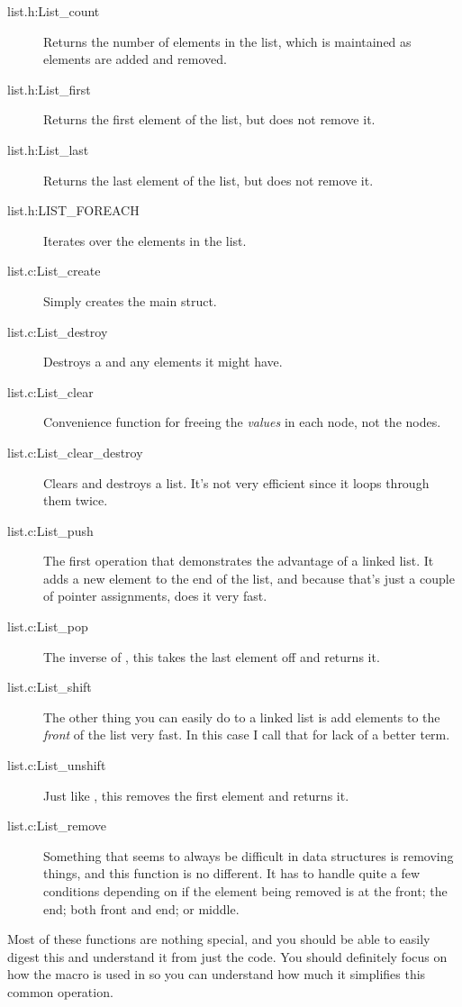 \begin{description}
\item[list.h:List\_count] Returns the number of elements in the list, which is 
    maintained as elements are added and removed.
\item[list.h:List\_first] Returns the first element of the list, but does not
    remove it.
\item[list.h:List\_last] Returns the last element of the list, but does not
    remove it.
\item[list.h:LIST\_FOREACH] Iterates over the elements in the list.
\item[list.c:List\_create] Simply creates the main  struct.
\item[list.c:List\_destroy] Destroys a  and any elements it might have.
\item[list.c:List\_clear] Convenience function for freeing the \emph{values} in each
    node, not the nodes.
\item[list.c:List\_clear\_destroy] Clears and destroys a list.  It's not very efficient since it loops through them twice.
\item[list.c:List\_push] The first operation that demonstrates the advantage of a
    linked list.  It adds a new element to the end of the list, and because that's
    just a couple of pointer assignments, does it very fast.
\item[list.c:List\_pop] The inverse of , this takes the last
    element off and returns it.
\item[list.c:List\_shift] The other thing you can easily do to a linked list is
    add elements to the \emph{front} of the list very fast.  In this case I call
    that  for lack of a better term.
\item[list.c:List\_unshift] Just like , this removes the first
    element and returns it.
\item[list.c:List\_remove] Something that seems to always be difficult in 
    data structures is removing things, and this function is no different. It
    has to handle quite a few conditions depending on if the element
    being removed is at the front; the end; both front and end; or middle.
\end{description}

Most of these functions are nothing special, and you should be able to easily
digest this and understand it from just the code.  You should definitely focus
on how the  macro is used in  so you
can understand how much it simplifies this common operation.

